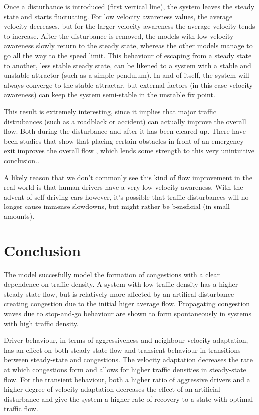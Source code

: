 \documentclass[11pt,a4paper,twocolumn]{article}
\begin{document}
Once a disturbance is introduced (first vertical line), the system leaves the steady state and starts fluctuating. For low velocity awareness values, the average velocity decreases, but for the larger velocity awareness the average velocity tends to increase.
After the disturbance is removed, the models with low velocity awareness slowly return to the steady state, whereas the other models manage to go all the way to the speed limit. This behaviour of escaping from a steady state to another, less stable steady state, can be likened to a system with a stable and unstable attractor (such as a simple pendulum). In and of itself, the system will always converge to the stable attractar, but external factors (in this case velocity awareness) can keep the system semi-stable in the unstable fix point.

This result is extremely interesting, since it implies that major traffic distrubances (such as a roadblack or accident) can actually improve the overall flow. Both during the disturbance and after it has been cleared up.
There have been studies that show that placing certain obstacles in front of an emergency exit improves the overall flow \cite{yanagisawa2009obstacle}, which lends some strength to this very unintuitive conclusion..

A likely reason that we don't commonly see this kind of flow improvement in the real world is that human drivers have a very low velocity awareness. With the advent of self driving cars however, it's possible that traffic disturbances  will no longer cause immense slowdowns, but might rather be beneficial (in small amounts).

\section{Conclusion}
The model succesfully model the formation of congestions with a clear dependence on traffic density. A system with low traffic density has a higher steady-state flow, but is relatively more affected by an artifical disturbance creating congestion due to the initial higer average flow. Propagating congestion waves due to stop-and-go behaviour are shown to form spontaneously in systems with high traffic density. 

Driver behaviour, in terms of aggressiveness and neighbour-velocity adaptation, has an effect on both steady-state flow and transient behaviour in transitions between steady-state and congestions. The velocity adaptation decreases the rate at which congestions form and allows for higher traffic densities in steady-state flow. For the transient behaviour, both a higher ratio of aggressive drivers and a higher degree of velocity adaptation decreases the effect of an artificial disturbance and give the system a higher rate of recovery to a state with optimal traffic flow.
\end{document}
